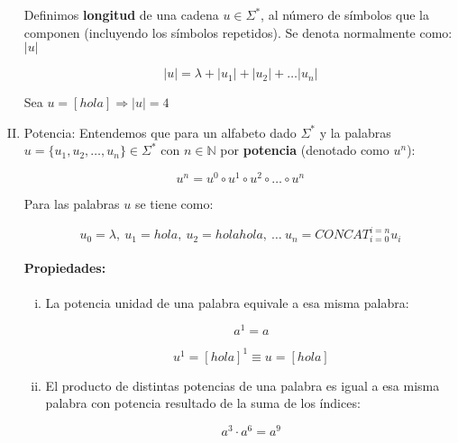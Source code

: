 \begin{enumerate}[I.]
{ Definimos \textbf{longitud} de una cadena $u \in \Sigma^{*}$, al número de 
símbolos que la componen (incluyendo los símbolos repetidos). Se denota 
normalmente como: $|u|$

\begin{equation}
|u| = \lambda + |u_1| + |u_2| + \ldots |u_n|  
\end{equation}


\ejem Sea $u = [hola] \Rightarrow |u| = 4$

}\item {}Potencia: Entendemos que para un alfabeto dado $\Sigma^*$ y la palabras 
$u = \{u_1, u_2, \ldots, u_n\} \in \Sigma^*$ con $n \in \mathbb{N}$ por 
\textbf{potencia} (denotado como $u^n$): {

\begin{equation}
u^n = u^0 \circ u^1 \circ u^2 \circ \ldots \circ u^n 
\end{equation}

\ejem Para las palabras $u$ se tiene como:

\begin{equation}
u_0 = \lambda,\ u_1 = hola,\ u_2 = holahola,\ \ldots\ u_n = {CONCAT}_{i = 0}^{i
= n}{u_i}
\end{equation}

\paragraph*{Propiedades:}

\begin{enumerate}[i.]

\item La potencia unidad de una palabra equivale a esa misma palabra:

\begin{equation}
a^1 = a
\end{equation}

\ejem

\begin{equation}
u^1 = [hola]^1 \equiv u = [hola]
\end{equation}


\item El producto de distintas potencias de una palabra es igual a esa misma
palabra con potencia resultado de la suma de los índices:

\begin{equation}
a^3\cdot a^6 = a^9
\end{equation}

\ejem


\end{enumerate}}
\end{enumerate}
